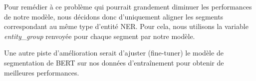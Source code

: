 \documentclass[a4paper, twoside, 11pt]{article}
\begin{document}
Pour remédier à ce problème qui pourrait grandement diminuer les performances de notre modèle, nous décidons donc d’uniquement aligner les segments correspondant au même type d’entité NER. Pour cela, nous utilisons la variable \textit{entity\_group} renvoyée pour chaque segment par notre modèle.

 Une autre piste d'amélioration serait d'ajuster (fine-tuner) le modèle de segmentation de BERT sur nos données d'entraînement pour obtenir de meilleures performances.
    \printbibliography
\end{document}
